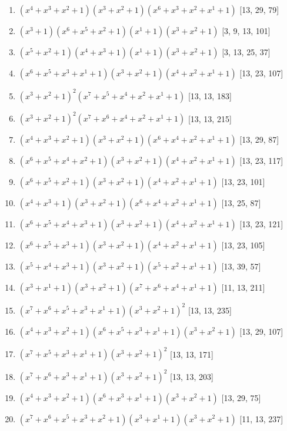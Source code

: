 \documentclass[10pt,twocolumn]{article}
\begin{document}
\begin{enumerate}
\item $(x^{4} + x^{3} + x^{2} + 1)(x^{3} + x^{2} + 1)(x^{6} + x^{3} + x^{2} + x^{1} + 1)$  [13, 29, 79]
\item $(x^{3} + 1)(x^{6} + x^{5} + x^{2} + 1)(x^{1} + 1)(x^{3} + x^{2} + 1)$  [3, 9, 13, 101]
\item $(x^{5} + x^{2} + 1)(x^{4} + x^{3} + 1)(x^{1} + 1)(x^{3} + x^{2} + 1)$  [3, 13, 25, 37]
\item $(x^{6} + x^{5} + x^{3} + x^{1} + 1)(x^{3} + x^{2} + 1)(x^{4} + x^{2} + x^{1} + 1)$  [13, 23, 107]
\item $(x^{3} + x^{2} + 1)^{2}(x^{7} + x^{5} + x^{4} + x^{2} + x^{1} + 1)$  [13, 13, 183]
\item $(x^{3} + x^{2} + 1)^{2}(x^{7} + x^{6} + x^{4} + x^{2} + x^{1} + 1)$  [13, 13, 215]
\item $(x^{4} + x^{3} + x^{2} + 1)(x^{3} + x^{2} + 1)(x^{6} + x^{4} + x^{2} + x^{1} + 1)$  [13, 29, 87]
\item $(x^{6} + x^{5} + x^{4} + x^{2} + 1)(x^{3} + x^{2} + 1)(x^{4} + x^{2} + x^{1} + 1)$  [13, 23, 117]
\item $(x^{6} + x^{5} + x^{2} + 1)(x^{3} + x^{2} + 1)(x^{4} + x^{2} + x^{1} + 1)$  [13, 23, 101]
\item $(x^{4} + x^{3} + 1)(x^{3} + x^{2} + 1)(x^{6} + x^{4} + x^{2} + x^{1} + 1)$  [13, 25, 87]
\item $(x^{6} + x^{5} + x^{4} + x^{3} + 1)(x^{3} + x^{2} + 1)(x^{4} + x^{2} + x^{1} + 1)$  [13, 23, 121]
\item $(x^{6} + x^{5} + x^{3} + 1)(x^{3} + x^{2} + 1)(x^{4} + x^{2} + x^{1} + 1)$  [13, 23, 105]
\item $(x^{5} + x^{4} + x^{3} + 1)(x^{3} + x^{2} + 1)(x^{5} + x^{2} + x^{1} + 1)$  [13, 39, 57]
\item $(x^{3} + x^{1} + 1)(x^{3} + x^{2} + 1)(x^{7} + x^{6} + x^{4} + x^{1} + 1)$  [11, 13, 211]
\item $(x^{7} + x^{6} + x^{5} + x^{3} + x^{1} + 1)(x^{3} + x^{2} + 1)^{2}$  [13, 13, 235]
\item $(x^{4} + x^{3} + x^{2} + 1)(x^{6} + x^{5} + x^{3} + x^{1} + 1)(x^{3} + x^{2} + 1)$  [13, 29, 107]
\item $(x^{7} + x^{5} + x^{3} + x^{1} + 1)(x^{3} + x^{2} + 1)^{2}$  [13, 13, 171]
\item $(x^{7} + x^{6} + x^{3} + x^{1} + 1)(x^{3} + x^{2} + 1)^{2}$  [13, 13, 203]
\item $(x^{4} + x^{3} + x^{2} + 1)(x^{6} + x^{3} + x^{1} + 1)(x^{3} + x^{2} + 1)$  [13, 29, 75]
\item $(x^{7} + x^{6} + x^{5} + x^{3} + x^{2} + 1)(x^{3} + x^{1} + 1)(x^{3} + x^{2} + 1)$  [11, 13, 237]

\end{enumerate}
\end{document}
